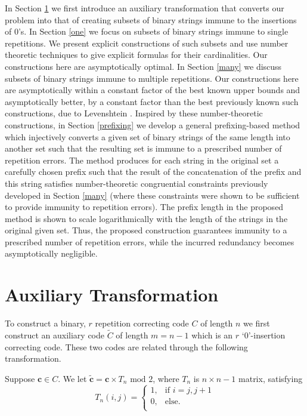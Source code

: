 \documentclass[12pt]{article} \pagestyle{plain} \topmargin
\begin{document}
In Section \ref{aux} we first introduce  an auxiliary transformation
that converts our problem into that of creating subsets of binary
strings immune to the insertions of $0$'s.
 In Section \ref{one} we
focus on subsets of binary strings immune to single repetitions. We
present explicit constructions of such subsets and use number
theoretic techniques to give explicit formulas for their
cardinalities. Our constructions here are asymptotically optimal. In
Section \ref{many} we discuss subsets of binary strings immune to
multiple repetitions. Our constructions here are asymptotically
within a constant factor of the best known upper bounds and
asymptotically better, by a constant factor than the best previously
known such constructions, due to Levenshtein \cite{lev:66a}.
Inspired by these number-theoretic constructions, in Section
\ref{prefixing} we develop a general prefixing-based method which
injectively converts a given set of binary strings of the same
length into another set such that the resulting set is immune to a
prescribed number of repetition errors. The method produces for each
string in the original set a carefully chosen prefix such that the
result of the concatenation of the prefix and this string satisfies
number-theoretic congruential constraints previously developed in
Section \ref{many} (where these constraints were shown to be
sufficient to provide immunity to repetition errors). The prefix
length in the proposed method is shown to scale logarithmically with
the length of the strings in the original given set. Thus, the
proposed construction guarantees immunity to a prescribed number of
repetition errors, while the incurred redundancy becomes
asymptotically negligible.



\section{Auxiliary Transformation}\label{aux}


To construct a binary, $r$ repetition correcting code $C$ of length
$n$ we first construct an auxiliary code $\tilde{C}$ of length
$m=n-1$ which is an $r$ `0'-insertion correcting code. These two
codes are related through the following transformation.


Suppose $\mathbf{c} \in C$. We let $\mathbf{\tilde{c}}= \mathbf{c}
\times T_n \text{ mod } 2$, where $T_n$ is $n \times n-1$ matrix,
satisfying\vspace{-0.0in}\begin{equation}\label{eq:t}T_{n}(i,j)=\left\{
\begin{array}{lll}
    1, & \text{if }i = j,j+1\\
    0, & \text{else.} \\
\end{array} \right. \end{equation}
\end{document}

